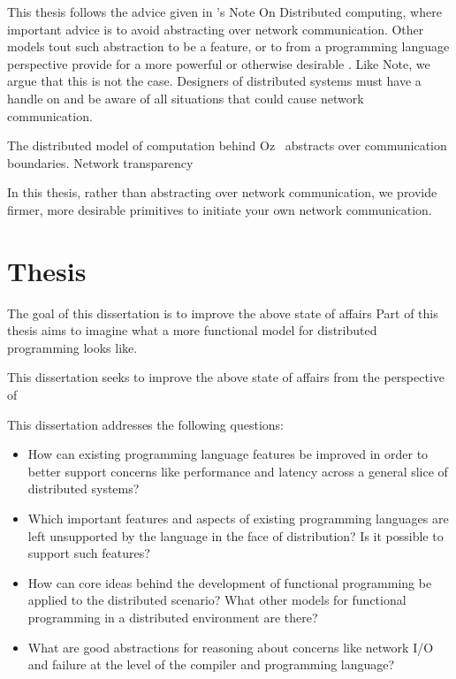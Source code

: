 This thesis follows the advice given in 's Note On Distributed computing, where
important advice is to avoid abstracting over network communication. Other
models tout such abstraction to be a feature, or to from a programming language
perspective provide for a more powerful or otherwise desirable . Like Note, we
argue that this is not the case. Designers of distributed systems must have a
handle on and be aware of all situations that could cause network communication.

The distributed model of computation behind Oz~\cite{DistributedOz} abstracts
over communication boundaries. Network transparency
~\cite{ConceptsTechniquesModelsProgramming}

In this thesis, rather than abstracting over network communication, we provide
firmer, more desirable primitives to initiate your own network communication.


\section{Thesis}

The goal of this dissertation is to improve the above state of affairs
Part of this thesis aims to imagine what a more functional model for distributed programming looks like.

This dissertation seeks to improve the above state of affairs from the
perspective of

This dissertation addresses the following questions:

\begin{itemize}

	\item How can existing programming language features be improved in order to
	better support concerns like performance and latency across a general slice of
	distributed systems?

	\item Which important features and aspects of existing programming languages
	are left unsupported by the language in the face of distribution? Is it
	possible to support such features?

	\item How can core ideas behind the development of functional programming be
	applied to the distributed scenario? What other models for functional
	programming in a distributed environment are there?

	\item What are good abstractions for reasoning about concerns like network I/O
	and failure at the level of the compiler and programming language?

\end{itemize}

